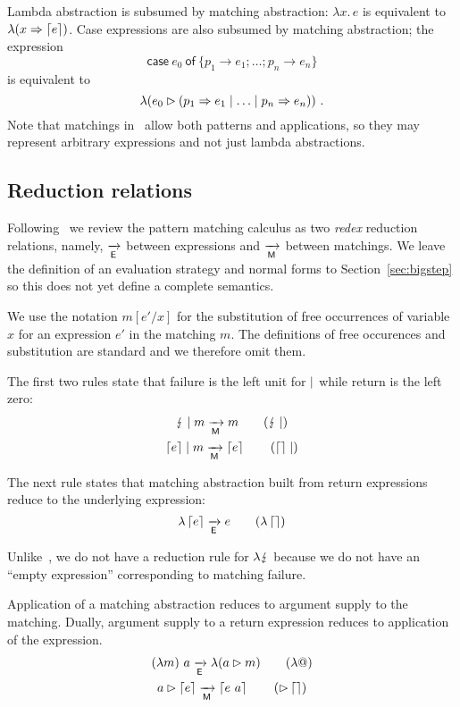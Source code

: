 Lambda abstraction is subsumed by matching abstraction:
$\lambda x.\, e$ is equivalent to
$\lambda (x \Rightarrow \left\lceil e\right\rceil)$.  Case expressions are also
subsumed by matching abstraction; the expression
\[
  \textsf{case}~ e_0 ~\textsf{of}~\{p_1\to e_1;\ldots; p_n\to e_n\}
\]
is equivalent to
\[
  \lambda(e_0\rhd (p_1 \Rightarrow e_1\mid\ldots \mid p_n \Rightarrow e_n)) \ .
\]
%
Note that matchings in \lambdaPMC\ allow both patterns and
applications, so they may represent arbitrary expressions
and not just lambda abstractions.  


\subsection{Reduction relations}\label{sec:reduction}
%
Following~\cite{kahl_2004} we review the pattern matching calculus as
two \emph{redex} reduction relations, namely, $\xrightarrow[\textsf{E}]{}$ between expressions and
$\xrightarrow[\textsf{M}]{}$ between matchings. We leave the definition of an evaluation
strategy and normal forms to Section~\ref{sec:bigstep} so this does
not yet define a complete semantics.

We use the notation $m[e'/x]$ for the substitution of free occurrences
of variable $x$ for an expression $e'$ in the matching $m$.
The definitions of free occurences and substitution are standard and
we therefore omit them.

The first two rules state that failure is the left unit for
$\mid$ while return is the left zero:
\begin{gather}
  \matchalt{\matchfail}{m} \matred m \tag{$\matchfail\amatchalt$}  \\
  \matchalt{\matchreturn{e}}{m} \matred \matchreturn{e} \tag{$\matchreturn{}\amatchalt$}
\end{gather}

The next rule states that matching abstraction built from return
expressions reduce to the underlying expression:
\begin{equation}
  \lambda \matchreturn{e} \expred e  \tag{$\lambda\matchreturn{}$} 
\end{equation}

Unlike~\cite{kahl_2004}, we do not have a reduction rule for
$\lambda \lightning$ because we do not have an ``empty expression''
corresponding to matching failure.

Application of a matching abstraction reduces to argument supply to
the matching.  Dually, argument supply to a return expression reduces
to application of the expression.
\begin{gather}
  (\lambda m)~ a \expred \lambda(\matcharg{a}{m}) \tag{$\lambda @$}\\
  \matcharg{a}{\matchreturn{e}} \matred \matchreturn{e~a} \tag{$\amatcharg\matchreturn{}$} 
\end{gather}


